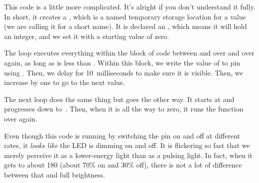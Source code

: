 This code is a little more complicated.
It's alright if you don't understand it fully.
In short, it creates a , which is a named temporary storage location for a value (we are calling it  for a short name).
It is declared an , which means it will hold an integer, and we set it with a starting value of zero.

The  loop executes everything within the block of code between \icode{\{} and \icode{\}} over and over again, as long as  is less than .
Within this block, we write the value of  to pin  using .
Then, we delay for 10~milliseconds to make sure it is visible.
Then, we increase  by one to go to the next value.

The next  loop does the same thing but goes the other way.
It starts at  and progresses down to~.
Then, when it is all the way to zero, it runs the  function over again.

Even though this code is running by switching the pin on and off at different rates, it \emph{looks like} the LED is dimming on and off.
It is flickering so fast that we merely perceive it as a lower-energy light than as a pulsing light.
In fact, when it gets to about 180 (about 70\% on and 30\% off), there is not a lot of difference between that and full brightness.

\applysection


